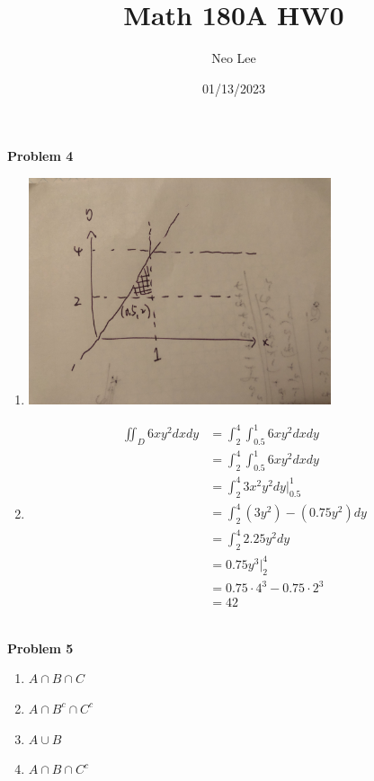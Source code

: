 \documentclass{article}
\title{Math 180A HW0}
\author{Neo Lee}
\date{01/13/2023}
\begin{document}
 

\maketitle 

\textbf{Problem 4} 
\begin{enumerate}[label=(\alph*)]
    \item 
    \begin{center}
        
        \includegraphics[width=0.7\textwidth]{Q4.jpg}
    \end{center}
    \item 
    \begin{align}
        \iint_{D}6xy^{2}dxdy &= \int_{2}^{4}\int_{0.5}^{1}6xy^{2}dxdy 
        \\ &= \int_{2}^{4} \int_{0.5}^{1} 6xy^{2} dxdy 
        \\ &= \int_{2}^{4} 3x^{2}y^{2} dy \Big|_{0.5}^{1}
        \\ &= \int_{2}^{4} \left(3y^{2}\right) - \left(0.75y^{2}\right) dy
        \\ &= \int_{2}^{4} 2.25y^{2} dy
        \\ &= 0.75y^{3} \Big|_{2}^{4}
        \\ &= 0.75 \cdot 4^{3} - 0.75 \cdot 2^{3}
        \\ &= 42
    \end{align} \\
\end{enumerate}
\smallskip


\textbf{Problem 5} 
\begin{enumerate}[label=(\alph*)]
    \item $A \cap B \cap C$
    \item $A \cap B^{c} \cap C^{c}$
    \item $A \cup B$
    \item $A \cap B \cap C^{c}$ 
\end{enumerate}
\smallskip
\end{document}
